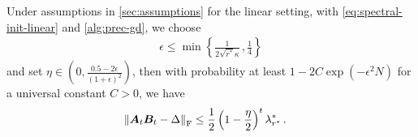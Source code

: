 \begin{theorem}
    \label{prec-gd-linear-conv}
    Under assumptions in \cref{sec:assumptions} for the linear setting, with \eqref{eq:spectral-init-linear} and \eqref{alg:prec-gd}, we choose
    \begin{align*}
        \epsilon\leq\min\left\{\frac{1}{2\sqrt{r^*}\kappa}\,,\frac{1}{4}\right\}
    \end{align*}
    and set $ \eta \in \left(0, \frac{0.5-2\epsilon}{(1+\epsilon)^2}\right)$, then with probability at least $1- 2C\exp(-\epsilon^2 N)$ for a universal constant $C>0$, we have
    \begin{align*}
        \left\|\bm A_t \bm B_t - \Delta\right\|_{\rm F} & \leq \frac{1}{2}\left(1-\frac{\eta}{2}\right)^t\lambda_{r^*}^*\,.
    \end{align*}
\end{theorem}
